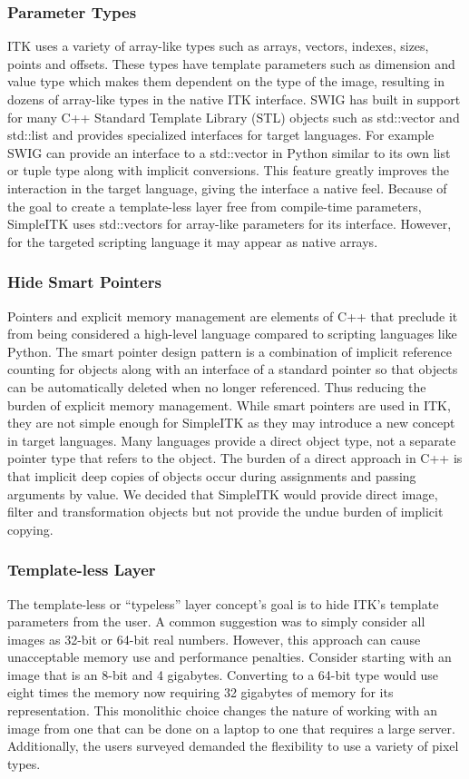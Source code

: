 \documentclass{frontiersMED} %
\begin{document}
\subsubsection{Parameter Types}
ITK uses a variety of array-like types such as arrays, vectors,
indexes, sizes, points and offsets. These types have template
parameters such as dimension and value type which makes them dependent
on the type of the image, resulting in dozens of array-like types in
the native ITK interface. SWIG has built in support for many C++
Standard Template Library (STL) objects such as std::vector and
std::list and provides specialized interfaces for target
languages. For example SWIG can provide an interface to a std::vector
in Python similar to its own list or tuple type along with implicit
conversions. This feature greatly improves the interaction in the
target language, giving the interface a native feel. Because of the
goal to create a template-less layer free from compile-time
parameters, SimpleITK uses std::vectors for array-like parameters for
its interface. However, for the targeted scripting language it may
appear as native arrays.

\subsubsection{Hide Smart Pointers}
Pointers and explicit memory management are elements of C++ that
preclude it from being considered a high-level language compared to
scripting languages like Python. The smart pointer design pattern is a
combination of implicit reference counting for objects along with an
interface of a standard pointer so that objects can be automatically
deleted when no longer referenced. Thus reducing the burden of explicit
memory management. While smart pointers are used in ITK, they are not
simple enough for SimpleITK as they may introduce a new concept in
target languages. Many languages provide a direct object type, not a
separate pointer type that refers to the object. The burden of a
direct approach in C++ is that implicit deep copies of objects occur
during assignments and passing arguments by value. We decided that
SimpleITK would provide direct image, filter and transformation
objects but not provide the undue burden of implicit copying.

\subsubsection{Template-less Layer}
The template-less or “typeless” layer concept's goal is to hide ITK's
template parameters from the user. A common suggestion was to simply
consider all images as 32-bit or 64-bit real numbers. However, this
approach can cause unacceptable memory use and performance
penalties. Consider starting with an image that is an 8-bit and 4
gigabytes.  Converting to a 64-bit type would use eight times the
memory now requiring 32 gigabytes of memory for its
representation. This monolithic choice changes the nature of working
with an image from one that can be done on a laptop to one that
requires a large server. Additionally, the users surveyed demanded the
flexibility to use a variety of pixel types.
\end{document}
